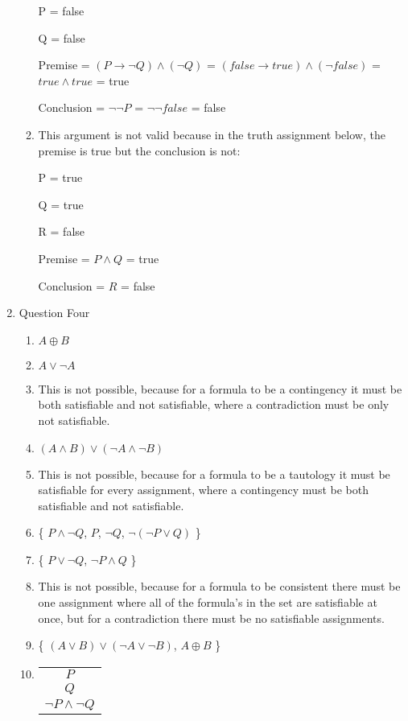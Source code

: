 \documentclass{article}
\begin{document}
\begin{enumerate}
\begin{enumerate}
        P = false

        Q = false

        Premise = $(P \rightarrow \neg Q) \land (\neg Q)$ = $(false \rightarrow true) \land (\neg false)$ = $true \land true$ = true

        Conclusion = $\neg \neg P$ = $\neg \neg false$ = false
        \item
        This argument is not valid because in the truth assignment below, the premise is true but the conclusion is not:
        
        P = true

        Q = true

        R = false

        Premise = $P \land Q$ = true

        Conclusion = $R$ = false
    \end{enumerate}
    \item Question Four
    \begin{enumerate}
        \item $A \oplus B$
        \item $A \lor \neg A$
        \item This is not possible, because for a formula to be a contingency it must be both satisfiable and not satisfiable, where a contradiction must be only not satisfiable.
        \item $(A \land B) \lor (\neg A \land \neg B)$
        \item This is not possible, because for a formula to be a tautology it must be satisfiable for every assignment, where a contingency must be both satisfiable and not satisfiable.
        \item \{ $P \land \neg Q$, $P$, $\neg Q$, $\neg (\neg P \lor Q)$ \}
        \item \{ $P \lor \neg Q$, $\neg P \land Q$ \}
        \item This is not possible, because for a formula to be consistent there must be one assignment where all of the formula's in the set are satisfiable at once, but for a contradiction there must be no satisfiable assignments.
        \item \{ $(A \lor B) \lor (\neg A \lor \neg B)$, $A \oplus B$ \}
        \item 
        \begin{tabular}{c}
            $P$ \\
            $Q$ \\
            \hline
            $\neg P \land \neg Q$ \\

\end{tabular}
\end{enumerate}
\end{enumerate}
\end{document}
